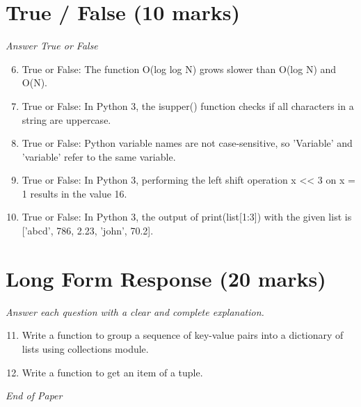 \documentclass[12pt]{article}
\begin{document}
\section*{True / False (10 marks)}
\textit{Answer True or False}
\begin{enumerate}[label=\arabic*.]
\setcounter{enumi}{5}
\item True or False: The function O(log log N) grows slower than O(log N) and O(N).
\item True or False: In Python 3, the isupper() function checks if all characters in a string are uppercase.
\item True or False: Python variable names are not case-sensitive, so 'Variable' and 'variable' refer to the same variable.
\item True or False: In Python 3, performing the left shift operation x \textless{}\textless{} 3 on x = 1 results in the value 16.
\item True or False: In Python 3, the output of print(list[1:3]) with the given list is ['abcd', 786, 2.23, 'john', 70.2].
\end{enumerate}

\section*{Long Form Response (20 marks)}
\textit{Answer each question with a clear and complete explanation.}
\begin{enumerate}[label=\arabic*.]
\setcounter{enumi}{10}
\item Write a function to group a sequence of key-value pairs into a dictionary of lists using collections module.
\item Write a function to get an item of a tuple.
\end{enumerate}

\vfill
\noindent\textit{End of Paper}
\end{document}
